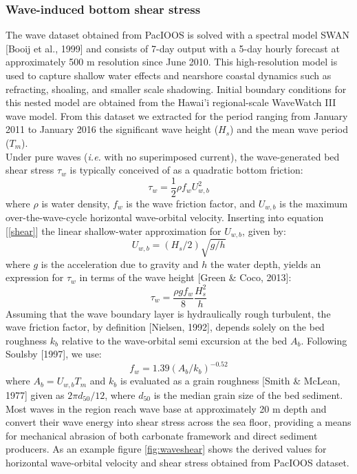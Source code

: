 \documentclass[9pt,twocolumn,twoside]{pnas-new}
\begin{document}
\subsubsection*{Wave-induced bottom shear stress}

The wave dataset obtained from PacIOOS is solved with a spectral model SWAN [Booij et al., 1999] and consists of 7-day output with a 5-day hourly forecast at approximately 500 m resolution since June 2010. This high-resolution model is used to capture shallow water effects and nearshore coastal dynamics such as refracting, shoaling, and smaller scale shadowing. Initial boundary conditions for this nested model are obtained from the Hawai'i regional-scale WaveWatch III wave model. From this dataset we extracted for the period ranging from January 2011 to January 2016 the significant wave height ($H_s$) and the mean wave period ($T_m$). \\
Under pure waves (\textit{i.e.} with no superimposed current), the wave-generated bed shear stress $\tau_w$ is typically conceived of as a quadratic bottom friction:
\begin{equation}\label{shear}
\tau_w = \frac{1}{2} \rho f_w U_{w,b}^2
\end{equation}
where $\rho$ is water density, $f_w$ is the wave friction factor, and $U_{w,b}$ is the maximum over-the-wave-cycle horizontal wave-orbital velocity. Inserting into equation [\ref{shear}] the linear shallow-water approximation for $U_{w,b}$, given by:
\begin{equation}\label{uw}
U_{w,b} =(H_s/2)\sqrt{g/h}
\end{equation}
where $g$ is the acceleration due to gravity and $h$ the water depth, yields an expression for $\tau_w$ in terms of the wave height [Green \& Coco, 2013]:
\begin{equation}\label{shear2}
\tau_w = \frac{\rho g f_w}{8} \frac{H_s^2}{h}
\end{equation}
Assuming that the wave boundary layer is hydraulically rough turbulent, the wave friction factor, by definition [Nielsen, 1992], depends solely on the bed roughness $k_b$ relative to the wave-orbital semi excursion at the bed $A_b$. Following Soulsby [1997], we use:
\begin{equation}\label{fw}
f_w = 1.39(A_b/k_b)^{-0.52}
\end{equation}
where $A_b = U_{w,b}T_m$ and $k_b$ is evaluated as a grain roughness [Smith \& McLean, 1977] given as $2\pi d_{50}/12$, where $d_{50}$ is the median grain size of the bed sediment.\\
Most waves in the region reach wave base at approximately 20 m depth and convert their wave energy into shear stress across the sea floor, providing a means for mechanical abrasion of both carbonate framework and direct sediment producers. As an example figure \ref{fig:waveshear} shows the derived values for horizontal wave-orbital velocity and shear stress obtained from PacIOOS dataset.
\end{document}
